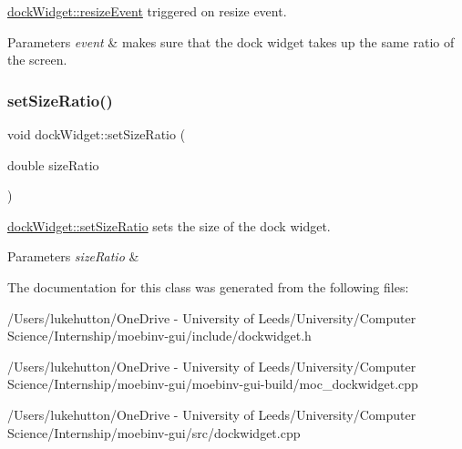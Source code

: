 \mbox{\hyperlink{classdock_widget_ae9cc3b91f10ee2af70fd74c6422848b6}{dock\+Widget\+::resize\+Event}} triggered on resize event. 


\begin{DoxyParams}{Parameters}
{\em event} & makes sure that the dock widget takes up the same ratio of the screen. \\
\hline
\end{DoxyParams}
\mbox{\label{classdock_widget_a7f6a50274259d918d9a9068b8a94fe80}} 
\subsubsection{\texorpdfstring{set\+Size\+Ratio()}{setSizeRatio()}}
{\footnotesize\ttfamily void dock\+Widget\+::set\+Size\+Ratio (\begin{DoxyParamCaption}\item[{double}]{size\+Ratio }\end{DoxyParamCaption})}



\mbox{\hyperlink{classdock_widget_a7f6a50274259d918d9a9068b8a94fe80}{dock\+Widget\+::set\+Size\+Ratio}} sets the size of the dock widget. 


\begin{DoxyParams}{Parameters}
{\em size\+Ratio} & \\
\hline
\end{DoxyParams}


The documentation for this class was generated from the following files\+:\begin{DoxyCompactItemize}
\item 
/\+Users/lukehutton/\+One\+Drive -\/ University of Leeds/\+University/\+Computer Science/\+Internship/moebinv-\/gui/include/dockwidget.\+h\item 
/\+Users/lukehutton/\+One\+Drive -\/ University of Leeds/\+University/\+Computer Science/\+Internship/moebinv-\/gui/moebinv-\/gui-\/build/moc\+\_\+dockwidget.\+cpp\item 
/\+Users/lukehutton/\+One\+Drive -\/ University of Leeds/\+University/\+Computer Science/\+Internship/moebinv-\/gui/src/dockwidget.\+cpp\end{DoxyCompactItemize}

